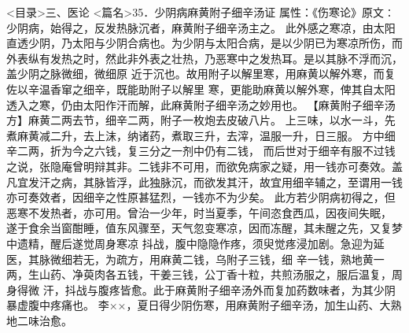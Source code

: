 \documentclass[a4paper,12pt,UTF8,twoside]{ctexbook}
\begin{document}
<目录>三、医论
<篇名>35．少阴病麻黄附子细辛汤证
属性：《伤寒论》原文∶少阴病，始得之，反发热脉沉者，麻黄附子细辛汤主之。 
此外感之寒凉，由太阳直透少阴，乃太阳与少阴合病也。为少阴与太阳合病，是以少阴已为寒凉所伤，而 
外表纵有发热之时，然此非外表之壮热，乃恶寒中之发热耳。是以其脉不浮而沉，盖少阴之脉微细，微细原 
近于沉也。故用附子以解里寒，用麻黄以解外寒，而复佐以辛温香窜之细辛，既能助附子以解里 
寒，更能助麻黄以解外寒，俾其自太阳透入之寒，仍由太阳作汗而解，此麻黄附子细辛汤之妙用也。 
【麻黄附子细辛汤方】麻黄二两去节，细辛二两，附子一枚炮去皮破八片。 
上三味，以水一斗，先煮麻黄减二升，去上沫，纳诸药，煮取三升，去滓，温服一升，日三服。 
方中细辛二两，折为今之六钱，复三分之一剂中仍有二钱， 
而后世对于细辛有服不过钱之说，张隐庵曾明辩其非。二钱非不可用，而欲免病家之疑，用一钱亦可奏效。盖 
凡宜发汗之病，其脉皆浮，此独脉沉，而欲发其汗，故宜用细辛辅之，至谓用一钱 
亦可奏效者，因细辛之性原甚猛烈，一钱亦不为少矣。 
此方若少阴病初得之，但恶寒不发热者，亦可用。曾治一少年，时当夏季，午间恣食西瓜，因夜间失眠， 
遂于食余当窗酣睡，值东风骤至，天气忽变寒凉，因而冻醒，其未醒之先，又复梦中遗精，醒后遂觉周身寒凉 
抖战，腹中隐隐作疼，须臾觉疼浸加剧。急迎为延医，其脉微细若无，为疏方，用麻黄二钱，乌附子三钱，细 
辛一钱，熟地黄一两，生山药、净萸肉各五钱，干姜三钱，公丁香十粒，共煎汤服之，服后温复，周身得微 
汗，抖战与腹疼皆愈。此于麻黄附子细辛汤外而复加药数味者，为其少阴暴虚腹中疼痛也。 
李××，夏日得少阴伤寒，用麻黄附子细辛汤，加生山药、大熟地二味治愈。 
\end{document}
